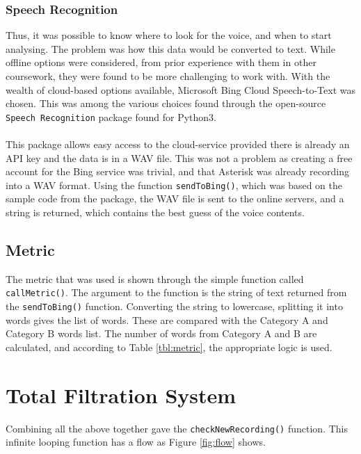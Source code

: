 \documentclass[main.tex]{subfiles}
\begin{document}
\subsubsection{Speech Recognition}
Thus, it was possible to know where to look for the voice, and when to start analysing. The problem was how this data would be converted to text. While offline options were considered, from prior experience with them in other coursework, they were found to be more challenging to work with. With the wealth of cloud-based options available, Microsoft Bing Cloud Speech-to-Text was chosen. This was among the various choices found through the open-source \texttt{Speech Recognition} package found for Python3.
\\\\
This package allows easy access to the cloud-service provided there is already an API key and the data is in a WAV file. This was not a problem as creating a free account for the Bing service was trivial, and that Asterisk was already recording into a WAV format. Using the function \texttt{sendToBing()}, which was based on the sample code from the package, the WAV file is sent to the online servers, and a string is returned, which contains the best guess of the voice contents.

\subsection{Metric}
The metric that was used is shown through the simple function called \texttt{callMetric()}. The argument to the function is the string of text returned from the \texttt{sendToBing()} function. Converting the string to lowercase, splitting it into words gives the list of words. These are compared with the Category A and Category B words list. The number of words from Category A and B are calculated, and according to Table \ref{tbl:metric}, the appropriate logic is used.

\section{Total Filtration System}
Combining all the above together gave the \texttt{checkNewRecording()} function. This infinite looping function has a flow as Figure \ref{fig:flow} shows.
\end{document}
